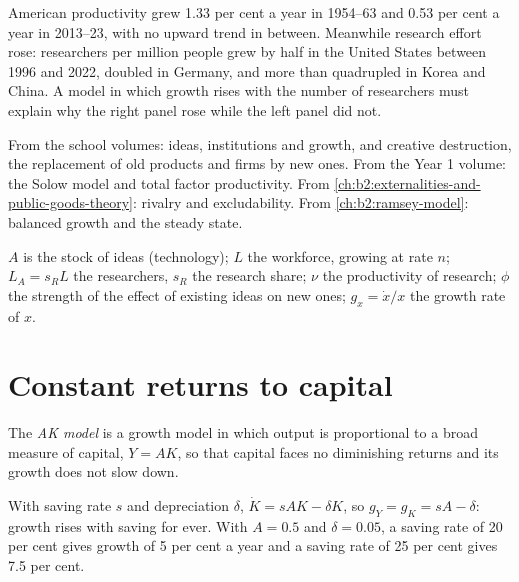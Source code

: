 American productivity grew 1.33 per cent a year in 1954--63 and 0.53 per cent a year in 2013--23, with no upward trend in between. Meanwhile research effort
rose: researchers per million people grew by half in the United States between 1996 and 2022, doubled in Germany, and more
than quadrupled in Korea and China. A model in which growth rises with the number of researchers must explain why the right
panel rose while the left panel did not.

\begin{recall}
From the school volumes: ideas, institutions and growth, and creative destruction, the replacement of old products and
firms by new ones. From the Year 1 volume: the Solow model and total factor productivity. From \cref{ch:b2:externalities-and-public-goods-theory}: rivalry and
excludability. From \cref{ch:b2:ramsey-model}: balanced growth and the steady state.
\end{recall}

\begin{notation}\label{not:b2:endogenous-growth:symbols}
$A$ is the stock of ideas (technology); $L$ the workforce, growing at rate $n$; $L_A = s_RL$ the researchers, $s_R$ the research share; $\nu$ the productivity of research;
$\phi$ the strength of the effect of existing ideas on new ones; $g_x = \dot x/x$ the growth rate of $x$.
\end{notation}

\section{Constant returns to capital}\label{sec:b2:endogenous-growth:ak}

\begin{definition}[AK model]\label{def:b2:endogenous-growth:ak}
The \emph{AK model} is a growth model in which output is proportional to a broad measure of capital, $Y = AK$,
so that capital faces no diminishing returns and its growth does not slow down.
\end{definition}

With saving rate $s$ and depreciation $\delta$, $\dot K = sAK - \delta K$, so $g_Y = g_K = sA - \delta$: growth rises with saving for ever. With $A = 0.5$ and $\delta = 0.05$, a saving rate of 20 per cent gives growth of 5 per cent a
year and a saving rate of 25 per cent gives 7.5 per cent.


